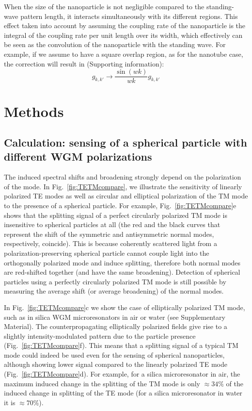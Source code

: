 \documentclass[journal=jacsat,manuscript=article]{achemso}
\begin{document}
When the size of the nanoparticle is not negligible compared to the standing-wave pattern length, it interacts simultaneously with its different regions. This effect taken into account by assuming the coupling rate of the nanoparticle is the integral of the coupling rate per unit length over its width, which effectively can be seen as the convolution of the nanoparticle with the standing wave. For example, if we assume to have a square overlap region, as for the nanotube case, the correction will result in (Supporting information):
\begin{equation}
g_{k,k'} \rightarrow \frac{\sin{\left( wk \right)}}{wk} g_{k,k'}
\end{equation}

\section{Methods}

\subsection{Calculation: sensing of a spherical particle with different WGM polarizations}

The induced spectral shifts and broadening strongly depend on the polarization of the mode.  In Fig.~\ref{fig:TETMcompare}, we illustrate the sensitivity of linearly polarized TE modes as well as circular and elliptical polarization of the TM mode to the presence of a spherical particle. For example, Fig.~\ref{fig:TETMcompare}e shows that the splitting signal of a perfect circularly polarized TM mode is insensitive to spherical particles at all (the red and the black curves that represent the shift of the symmetric and antisymmetric normal modes, respectively, coincide). This is because coherently scattered light from a polarization-preserving spherical particle cannot couple light into the orthogonally polarized mode and induce splitting, therefore both normal modes are red-shifted together (and have the same broadening). Detection of spherical particles using a perfectly circularly polarized TM mode is still possible by measuring the average shift (or average broadening) of the normal modes.

In Fig.~\ref{fig:TETMcompare}c we show the case of elliptically polarized TM mode, such as in silica WGM microresonators in air or water (see Supplementary Material). The counterpropagating elliptically polarized fields give rise to a slightly intensity-modulated pattern due to the particle presence (Fig.~\ref{fig:TETMcompare}f). This means that a splitting signal of a typical TM mode could indeed be used even for the sensing of spherical nanoparticles, although showing lower signal compared to the linearly polarized TE mode (Fig.~\ref{fig:TETMcompare}d). For example, for a silica microresonator in air, the maximum induced change in the splitting of the TM mode is only $\approx 34\%$ of the induced change in splitting of the TE mode (for a silica microresonator in water it is $\approx 70 \%$).
\end{document}
